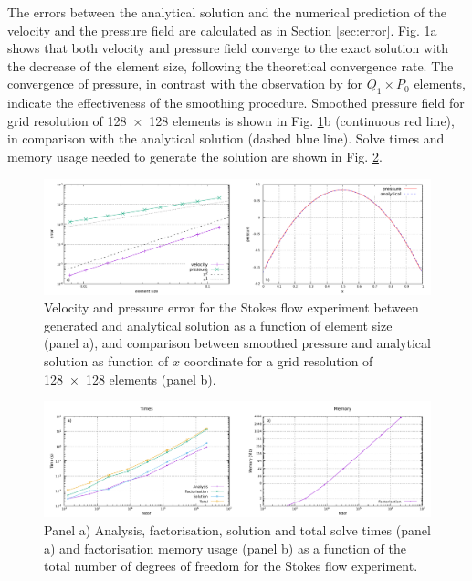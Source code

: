 \documentclass[hidelinks,10pt,a4paper]{article}
\begin{document}
The errors between the analytical solution and the numerical prediction of the velocity and the pressure field are calculated as in Section \ref{sec:error}.
Fig. \ref{fig:errors}a shows that both velocity and pressure field converge to the exact solution with the decrease of the element size, following the
theoretical convergence rate. The convergence of pressure, in contrast with the observation by \citet{Donea2003} for $Q_1 \times P_0$ elements, indicate the
effectiveness of the smoothing procedure. Smoothed pressure field for grid resolution of \num{128x128} elements is shown in Fig. \ref{fig:errors}b (continuous
red line), in comparison with the analytical solution (dashed blue line). Solve times and memory usage needed to generate the solution are shown in
Fig. \ref{fig:MUMPS}.

\begin{figure}
\centering
\noindent\includegraphics[width=\textwidth]{./Figures/errors.pdf}
\caption{Velocity and pressure error for the Stokes flow experiment between generated and analytical solution as a function of element size (panel a),
and comparison between smoothed pressure and analytical solution as function of $x$ coordinate for a grid resolution of \num{128x128} elements (panel b).}
\label{fig:errors}
\end{figure}

\begin{figure}
\noindent\includegraphics[width=\textwidth]{./Figures/MUMPS.pdf}
\caption{Panel a) Analysis, factorisation, solution and total solve times (panel a) and factorisation memory usage (panel b) as a function of the total number
of degrees of freedom for the Stokes flow experiment.}
\label{fig:MUMPS}
\end{figure}
\end{document}
